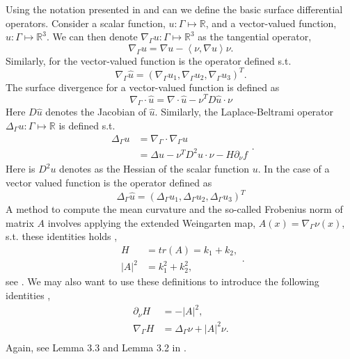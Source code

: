 Using the notation presented in \cite{dougan2012first} and \cite{kovacs2021convergent} can we define the basic surface differential operators. Consider a scalar function, $u: \Gamma \mapsto \mathbb{R} $, and a vector-valued function, $\hat{u}: \Gamma  \mapsto \mathbb{R} ^3$. We can then denote $ \nabla _{\Gamma } u: \Gamma \mapsto \mathbb{R} ^{3}$ as the tangential operator,
$$
\nabla_{\Gamma
} u  = \nabla u - \left<\nu, \nabla u \right> \nu.
$$
Similarly, for the vector-valued function is the operator defined s.t.
$$\nabla_{\Gamma } \hat{u} = \left( \nabla_{\Gamma } u_{1},\nabla_{\Gamma } u_{2},\nabla_{\Gamma } u_{3}   \right)^{T}.$$ The surface divergence for a vector-valued function is defined as \[
\nabla_{\Gamma } \cdot \hat{u} = \nabla  \cdot \hat{u} - \nu^{T} D \hat{u} \cdot \nu
\]
Here $D\hat{u}$ denotes the Jacobian of $\hat{u}$. Similarly, the Laplace-Beltrami operator $\Delta _{\Gamma }u: \Gamma \mapsto \mathbb{R}$ is defined s.t.
\begin{equation*}
    \begin{split}
 \Delta _{\Gamma } u  & = \nabla _{\Gamma } \cdot  \nabla _{\Gamma }u \\
 &=  \Delta u  - \nu ^{T} D^2 u \cdot \nu - H \partial _{\nu } f
    \end{split}
.\end{equation*}
Here is $D^2u$ denotes as the Hessian of the scalar function $u$. In the case of a vector valued function is the operator defined as \[
\Delta _{\Gamma } \hat{u} = \left( \Delta _{\Gamma } u_{1}, \Delta _{\Gamma } u_{2}, \Delta _{\Gamma } u_{3} \right)^{T}
\]
A method to compute the mean curvature and the so-called Frobenius norm of matrix $A$ involves applying the
extended Weingarten map, $ A\left( x \right) = \nabla_{\Gamma } \nu \left( x \right) $, s.t. these identities holds ,
\begin{equation*}
    \begin{split}
    H & = tr(A) = k_{1} + k_{2}, \\
    \left\lvert A \right\rvert^{2}  & = k_{1}^2 + k_{2}^2,
    \end{split}
.\end{equation*}
see \cite{kovacs2021convergent}.
We may also want to use these definitions to introduce the following identities ,
\[
    \begin{split}
         \partial _{\nu } H & = - \left\lvert A \right\rvert ^{2}, \\
    \nabla _{\Gamma } H & = \Delta  _{\Gamma } \nu  + \left\lvert A \right\rvert ^2 \nu.  \\
    \end{split}
\]
Again, see Lemma 3.3 and Lemma 3.2 in \cite{dougan2012first}.

